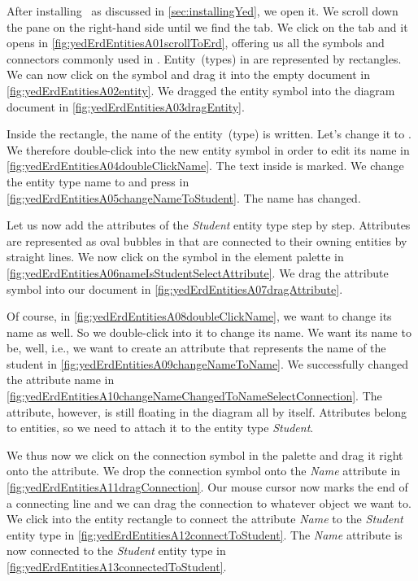 After installing \yEd\ as discussed in \cref{sec:installingYed}, we open it.
We scroll down the  pane on the right-hand side until we find the  tab.
We click on the tab and it opens in \cref{fig:yedErdEntitiesA01scrollToErd}, offering us all the symbols and connectors commonly used in .
Entity~(types) in  are represented by rectangles.
We can now click on the  symbol and drag it into the empty document in \cref{fig:yedErdEntitiesA02entity}.
We dragged the entity symbol into the diagram document in \cref{fig:yedErdEntitiesA03dragEntity}.

Inside the rectangle, the name of the entity~(type) is written.
Let's change it to .
We therefore double-click into the new entity symbol in order to edit its name in \cref{fig:yedErdEntitiesA04doubleClickName}.
The text inside is marked.
We change the entity type name to  and press \keys{\return} in \cref{fig:yedErdEntitiesA05changeNameToStudent}.
The name has changed.

Let us now add the attributes of the \emph{Student} entity type step by step.
Attributes are represented as oval bubbles in  that are connected to their owning entities by straight lines.
We now click on the  symbol in the element palette in \cref{fig:yedErdEntitiesA06nameIsStudentSelectAttribute}.
We drag the attribute symbol into our document in \cref{fig:yedErdEntitiesA07dragAttribute}.

Of course, in \cref{fig:yedErdEntitiesA08doubleClickName}, we want to change its name as well.
So we double-click into it to change its name.
We want its name to be, well,  i.e., we want to create an attribute that represents the name of the student in \cref{fig:yedErdEntitiesA09changeNameToName}.
We successfully changed the attribute name in \cref{fig:yedErdEntitiesA10changeNameChangedToNameSelectConnection}.
The attribute, however, is still floating in the diagram all by itself.
Attributes belong to entities, so we need to attach it to the entity type \emph{Student}.

We thus now we click on the connection symbol in the palette and drag it right onto the attribute.
We drop the connection symbol onto the \emph{Name} attribute in \cref{fig:yedErdEntitiesA11dragConnection}.
Our mouse cursor now marks the end of a connecting line and we can drag the connection to whatever object we want to.
We click into the entity rectangle to connect the attribute \emph{Name} to the \emph{Student} entity type in \cref{fig:yedErdEntitiesA12connectToStudent}.
The \emph{Name} attribute is now connected to the \emph{Student} entity type in \cref{fig:yedErdEntitiesA13connectedToStudent}.

